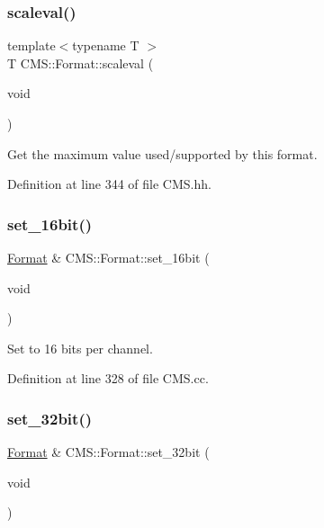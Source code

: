 \subsubsection{\texorpdfstring{scaleval()}{scaleval()}}
{\footnotesize\ttfamily template$<$typename T $>$ \\
T C\+M\+S\+::\+Format\+::scaleval (\begin{DoxyParamCaption}\item[{void}]{ }\end{DoxyParamCaption})\hspace{0.3cm}{\ttfamily [inline]}}



Get the maximum value used/supported by this format. 



Definition at line 344 of file C\+M\+S.\+hh.

\mbox{\label{class_c_m_s_1_1_format_a1e5135ecdedf8832ed905a91c5c185b9}} 
\subsubsection{\texorpdfstring{set\+\_\+16bit()}{set\_16bit()}}
{\footnotesize\ttfamily \hyperlink{class_c_m_s_1_1_format}{Format} \& C\+M\+S\+::\+Format\+::set\+\_\+16bit (\begin{DoxyParamCaption}\item[{void}]{ }\end{DoxyParamCaption})}



Set to 16 bits per channel. 



Definition at line 328 of file C\+M\+S.\+cc.

\mbox{\label{class_c_m_s_1_1_format_a8f3b1fedf1936518da6d9f2d33ff33be}} 
\subsubsection{\texorpdfstring{set\+\_\+32bit()}{set\_32bit()}}
{\footnotesize\ttfamily \hyperlink{class_c_m_s_1_1_format}{Format} \& C\+M\+S\+::\+Format\+::set\+\_\+32bit (\begin{DoxyParamCaption}\item[{void}]{ }\end{DoxyParamCaption})}



